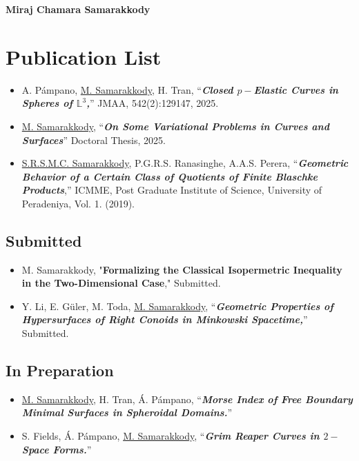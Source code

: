 \documentclass[12pt]{book}
\begin{document}
\begin{center}
	\textbf{\Huge{Miraj Chamara Samarakkody}}\\
\end{center}

\section*{Publication List}


\begin{itemize}
	\item A. P\'ampano, \underline{M. Samarakkody}, H. Tran, ``\textit{\textbf{Closed $p-$Elastic Curves in Spheres of $\mathbb{L}^{3}$,}}'' JMAA, 542(2):129147, 2025.
	\item \underline{M. Samarakkody}, ``\textit{\textbf{On Some Variational Problems in Curves and Surfaces}}'' Doctoral Thesis, 2025.
	\item \underline{S.R.S.M.C. Samarakkody}, P.G.R.S. Ranasinghe, A.A.S. Perera, ``\textit{\textbf{Geometric Behavior of a Certain Class of Quotients of Finite Blaschke Products}},'' ICMME, Post Graduate Institute of Science, University of Peradeniya, Vol. 1. (2019).
\end{itemize}

\subsection*{Submitted}

\begin{itemize}
	\item M. Samarakkody, "\textbf{Formalizing the Classical Isopermetric Inequality in the Two-Dimensional Case}," Submitted.
	\item Y. Li, E. G\"{u}ler, M. Toda, \underline{M. Samarakkody}, ``\textit{\textbf{Geometric Properties of Hypersurfaces of Right Conoids in Minkowski Spacetime,}}'' Submitted.
\end{itemize}

\subsection*{In Preparation}
\begin{itemize}
	\item \underline{M. Samarakkody}, H. Tran, \'A. P\'ampano, ``\textit{\textbf{Morse Index of Free Boundary Minimal Surfaces in Spheroidal Domains.}}''
	\item S. Fields, \'A. P\'ampano, \underline{M. Samarakkody}, ``\textit{\textbf{Grim Reaper Curves in $2-$Space Forms.}}''
\end{itemize}
\end{document}
